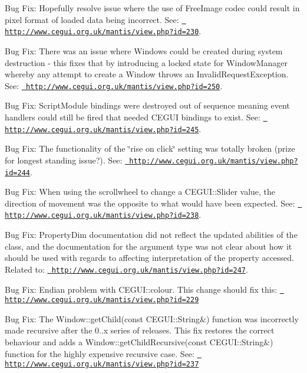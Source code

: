 \begin{DoxyItemize}
\item Bug Fix\+: Hopefully resolve issue where the use of Free\+Image codec could result in pixel format of loaded data being incorrect. See\+: \href{http://www.cegui.org.uk/mantis/view.php?id=230}{\texttt{ http\+://www.\+cegui.\+org.\+uk/mantis/view.\+php?id=230}}.
\item Bug Fix\+: There was an issue where Windows could be created during system destruction -\/ this fixes that by introducing a \textquotesingle{}locked\textquotesingle{} state for Window\+Manager whereby any attempt to create a Window throws an Invalid\+Request\+Exception. See\+: \href{http://www.cegui.org.uk/mantis/view.php?id=250}{\texttt{ http\+://www.\+cegui.\+org.\+uk/mantis/view.\+php?id=250}}.
\item Bug Fix\+: Script\+Module bindings were destroyed out of sequence meaning event handlers could still be fired that needed C\+E\+G\+UI bindings to exist. See\+: \href{http://www.cegui.org.uk/mantis/view.php?id=245}{\texttt{ http\+://www.\+cegui.\+org.\+uk/mantis/view.\+php?id=245}}.
\item Bug Fix\+: The functionality of the \char`\"{}rise on click\char`\"{} setting was totally broken (prize for longest standing issue?). See\+: \href{http://www.cegui.org.uk/mantis/view.php?id=244}{\texttt{ http\+://www.\+cegui.\+org.\+uk/mantis/view.\+php?id=244}}.
\item Bug Fix\+: When using the scrollwheel to change a C\+E\+G\+U\+I\+::\+Slider value, the direction of movement was the opposite to what would have been expected. See\+: \href{http://www.cegui.org.uk/mantis/view.php?id=238}{\texttt{ http\+://www.\+cegui.\+org.\+uk/mantis/view.\+php?id=238}}.
\item Bug Fix\+: Property\+Dim documentation did not reflect the updated abilities of the class, and the documentation for the argument \textquotesingle{}type\textquotesingle{} was not clear about how it should be used with regards to affecting interpretation of the property accessed. Related to\+: \href{http://www.cegui.org.uk/mantis/view.php?id=247}{\texttt{ http\+://www.\+cegui.\+org.\+uk/mantis/view.\+php?id=247}}.
\item Bug Fix\+: Endian problem with C\+E\+G\+U\+I\+::colour. This change should fix this\+: \href{http://www.cegui.org.uk/mantis/view.php?id=229}{\texttt{ http\+://www.\+cegui.\+org.\+uk/mantis/view.\+php?id=229}}
\item Bug Fix\+: The Window\+::get\+Child(const C\+E\+G\+U\+I\+::\+String\&) function was incorrectly made recursive after the 0..\+x series of releases. This fix restores the correct behaviour and adds a Window\+::get\+Child\+Recursive(const C\+E\+G\+U\+I\+::\+String\&) function for the highly expensive recursive case. See\+: \href{http://www.cegui.org.uk/mantis/view.php?id=237}{\texttt{ http\+://www.\+cegui.\+org.\+uk/mantis/view.\+php?id=237}}

\end{DoxyItemize}

